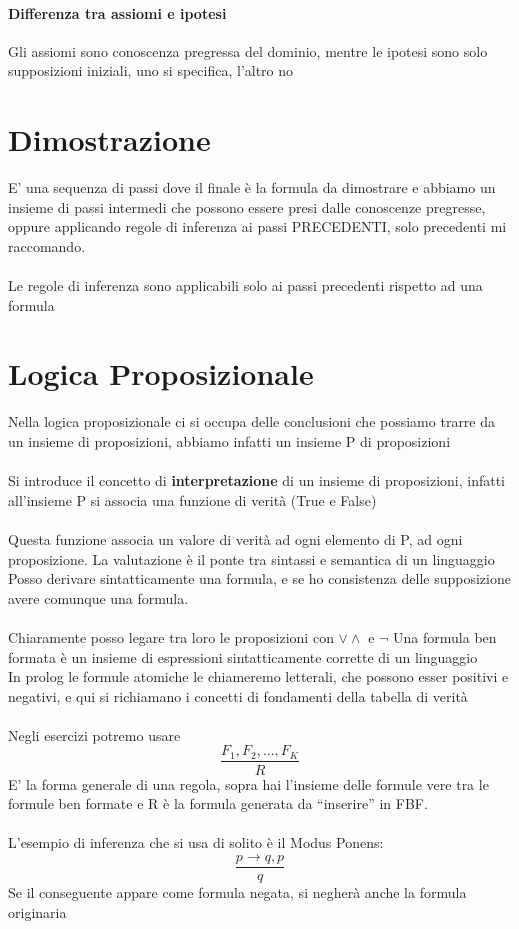 \documentclass[12pt, a4paper, openany, oneside]{book}
\begin{document}
\paragraph{Differenza tra assiomi e ipotesi}
Gli assiomi sono conoscenza pregressa del dominio, mentre le ipotesi sono solo
supposizioni iniziali, uno si specifica, l'altro no
\section{Dimostrazione}
E' una sequenza di passi dove il finale è la formula da dimostrare e abbiamo
un insieme di passi intermedi che possono essere presi dalle conoscenze
pregresse, oppure applicando regole di inferenza ai passi PRECEDENTI, solo
precedenti mi raccomando.
\\ \\
Le regole di inferenza sono applicabili solo ai passi precedenti rispetto ad 
una formula
\section{Logica Proposizionale}
Nella logica proposizionale ci si occupa delle conclusioni che possiamo 
trarre da un insieme di proposizioni, abbiamo infatti un insieme P di 
proposizioni \\ \\
Si introduce il concetto di \textbf{interpretazione} di un insieme di 
proposizioni, infatti all'insieme P si associa una funzione di verità (True e 
False) \\ \\
Questa funzione associa un valore di verità ad ogni elemento di P, ad ogni 
proposizione. La valutazione è il ponte tra sintassi e semantica di un 
linguaggio \\
Posso derivare sintatticamente una formula, e se ho consistenza delle supposizione
avere comunque una formula.
\\ \\
Chiaramente posso legare tra loro le proposizioni con $\vee \wedge$ e $\neg$ 
Una formula ben formata è un insieme di espressioni sintatticamente corrette di
un linguaggio
\\
In prolog le formule atomiche le chiameremo letterali, che possono esser 
positivi e negativi, e qui si richiamano i concetti di fondamenti della tabella
di verità
\\ \\
Negli esercizi potremo usare 
\[\frac{F_{1}, F_{2}, ... , F_{K}}{R}\]
E' la forma generale di una regola, sopra hai l'insieme delle formule vere tra 
le formule ben formate e R è la formula generata da “inserire” in FBF. \\ \\
L'esempio di inferenza che si usa di solito è il Modus Ponens: 
\[\frac{p \to q, p}{q} \]
Se il conseguente appare come formula negata, si negherà anche la formula originaria
\end{document}

